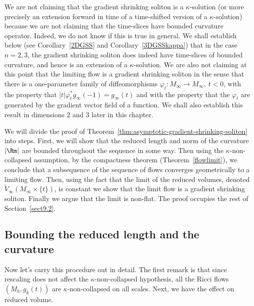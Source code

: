 \begin{remark}\label{rem:asymptotic-soliton-caveats}
We are not claiming that the gradient shrinking soliton is a
$\kappa$-solution (or more precisely an extension forward in time of
a time-shifted version of a $\kappa$-solution) because we are not
claiming that the time-slices have bounded curvature operator.
Indeed, we do not know if this is true in general. We shall
establish below (see Corollary~\ref{2DGSS} and
Corollary~\ref{3DGSSkappa}) that in the case $n=2,3$, the gradient
shrinking soliton does indeed have time-slices of bounded curvature,
and hence is an extension of a $\kappa$-solution. We are also not
claiming at this point that the limiting flow is a gradient
shrinking soliton in the sense that there is a one-parameter family
of diffeomorphisms $\varphi_t\colon M_\infty\to M_\infty,\ t<0$,
with the property that $|t|\varphi_t^*g_\infty(-1)=g_\infty(t)$ and
with the property that the $\varphi_t$ are generated by the gradient
vector field of a function. We shall also
 establish this result in dimensions $2$ and $3$ later in this chapter.
\end{remark}



We will divide the proof of Theorem~\ref{thm:asymptotic-gradient-shrinking-soliton} into steps.
First, we will show that the reduced length and norm of the
curvature $|\Rm|$ are bounded throughout the sequence in some
way. Then using the $\kappa$-non-collapsed assumption, by the
compactness theorem (Theorem~\ref{flowlimit}), we conclude that a
subsequence of the sequence of flows converges geometrically to a
limiting flow. Then, using the fact that the limit of the reduced
volumes, denoted $\widetilde
V_{\infty}(M_\infty\times\{t\})$, is
constant we show that the limit flow is a gradient shrinking
soliton. Finally we argue that
the limit is non-flat. The proof occupies the rest of
Section~\ref{sect9.2}.

\subsection{Bounding the reduced length and the curvature}
Now let's carry this procedure out in detail. The first remark is
that since rescaling does not affect the $\kappa$-non-collapsed
hypothesis, all the Ricci flows $(M_k,g_k(t))$ are
$\kappa$-non-collapsed on all scales. Next, we have the effect on
reduced volume.

